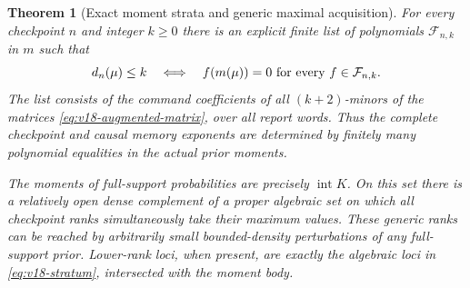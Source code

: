 \documentclass[11pt]{amsart}
\newtheorem{theorem}{Theorem}[section]
\theoremstyle{definition}\newtheorem{definition}[theorem]{Definition}
\theoremstyle{remark}\newtheorem{remark}[theorem]{Remark}
\begin{document}
\begin{theorem}[Exact moment strata and generic maximal acquisition]
\label{thm:v18-moment-strata}
For every checkpoint $n$ and integer $k\ge0$ there is an explicit finite
list of polynomials $\mathcal F_{n,k}$ in $m$ such that
\begin{equation}\label{eq:v18-stratum}
 d_n(\mu)\le k\quad\Longleftrightarrow\quad
 f(m(\mu))=0\ \hbox{for every }f\in\mathcal F_{n,k}.
\end{equation}
The list consists of the command coefficients of all $(k+2)$-minors
of the matrices \eqref{eq:v18-augmented-matrix}, over all report words.
Thus the complete checkpoint and causal memory exponents are determined
by finitely many polynomial equalities in the actual prior moments.

The moments of full-support probabilities are precisely $\operatorname{int}K$.
On this set there is a relatively open dense complement of a proper
algebraic set on which all checkpoint ranks simultaneously take their
maximum values. These generic ranks can be reached by arbitrarily small
bounded-density perturbations of any full-support prior. Lower-rank
loci, when present, are exactly the algebraic loci in
\eqref{eq:v18-stratum}, intersected with the moment body.
\end{theorem}
\end{document}
